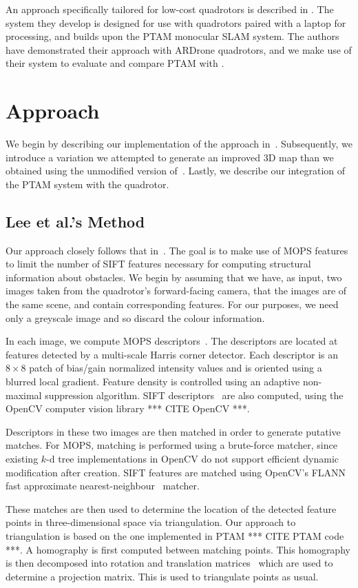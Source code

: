 \documentclass{acmsiggraph}
\begin{document}
An approach specifically tailored for low-cost quadrotors is described in \cite{engel2012a,engel2012b}. The system they develop is designed for use with quadrotors paired with a laptop for processing, and builds upon the PTAM monocular SLAM system. The authors have demonstrated their approach with ARDrone quadrotors, and we make use of their system to evaluate and compare PTAM with \cite{lee2011}.

\section{Approach}
We begin by describing our implementation of the approach in~\cite{lee2011}. Subsequently, we introduce a variation we attempted to generate an improved 3D map than we obtained using the unmodified version of~\cite{lee2011}.  Lastly, we describe our integration of the PTAM system with the quadrotor.

\subsection{Lee et al.'s Method}
Our approach closely follows that in~\cite{lee2011}. The goal is to make use of MOPS features to limit the number of SIFT features necessary for computing structural information about obstacles. We begin by assuming that we have, as input, two images taken from the quadrotor's forward-facing camera, that the images are of the same scene, and contain corresponding features. For our purposes, we need only a greyscale image and so discard the colour information.

In each image, we compute MOPS descriptors~\cite{BSW05}. The descriptors are located at features detected by a multi-scale Harris corner detector. Each descriptor is an $8 \times 8$ patch of bias/gain normalized intensity values and is oriented using a blurred local gradient. Feature density is controlled using an adaptive non-maximal suppression algorithm. SIFT descriptors~\cite{lowe2004} are also computed, using the OpenCV computer vision library *** CITE OpenCV ***.

Descriptors in these two images are then matched in order to generate putative matches. For MOPS, matching is performed using a brute-force matcher, since existing $k$-d tree implementations in OpenCV do not support efficient dynamic modification after creation. SIFT features are matched using OpenCV's FLANN fast approximate nearest-neighbour~\cite{flann2009} matcher.

These matches are then used to determine the location of the detected feature points in three-dimensional space via triangulation. Our approach to triangulation is based on the one implemented in PTAM *** CITE PTAM code ***. A homography is first computed between matching points. This homography is then decomposed into rotation and translation matrices~\cite{inria2007} which are used to determine a projection matrix. This is used to triangulate points as usual.
\end{document}
